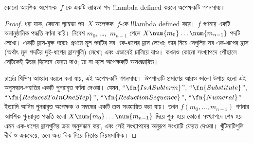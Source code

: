 \documentclass[../../../include/open-logic-section]{subfiles}
\begin{document}

\begin{thm}
কোনো আংশিক অপেক্ষক~$f$-কে একটি ল্যাম্বডা পদ !!{lambda defined} করলে
অপেক্ষকটি গণনসাধ্য।
\end{thm}

\begin{proof}
ধরা যাক, কোনো ল্যাম্বডা পদ~$X$ অপেক্ষক~$f$-কে !!{lambda defined} করে।
$f$ গণনার একটি অনানুষ্ঠানিক পদ্ধতি বর্ণনা করি। নিবেশ $m_0$,
\dots,~$m_{n-1}$ পেলে $X \num{m_0} \ldots \num{m_{n-1}}$ পদটি লেখো।
একটি হ্রাস-বৃক্ষ গড়ো: প্রথমে মূল পদটির সব এক-ধাপের হ্রাস লেখো; তার নিচে
সেগুলির সব এক-ধাপের হ্রাস (অর্থাৎ মূল পদটির দুই-ধাপের হ্রাসগুলি) লেখো;
এবং এভাবেই চালিয়ে যাও। কখনও কোনো সংখ্যাপদে পৌঁছালে সেটিকেই উত্তর হিসেবে
ফেরত দাও; তা না হলে অপেক্ষকটি অসংজ্ঞায়িত।

চার্চের থিসিস আহ্বান করলে বলা যায়, এই অপেক্ষকটি গণনসাধ্য। উপপাদ্যটি
প্রমাণের আরও ভালো উপায় হলো এই অনুসন্ধান-পদ্ধতির একটি পুনরাবৃত্ত বর্ণনা
দেওয়া। যেমন, ``$\fn{IsASubterm}$'', ``$\fn{Substitute}$'',
``$\fn{ReducesToInOneStep}$'', ``$\fn{ReductionSequence}$'',
``$\fn{Numeral}$'' ইত্যাদি আদিম পুনরাবৃত্ত অপেক্ষক ও সম্বন্ধের একটি ক্রম
সংজ্ঞায়িত করা যায়। তখন $f(m_0, \dots, m_{n-1})$ গণনার আংশিক পুনরাবৃত্ত
পদ্ধতি হলো $X \num{m_0} \dots \num{m_{n-1}}$ দিয়ে শুরু হয়ে কোনো
সংখ্যাপদে শেষ হয় এমন এক-ধাপের হ্রাসগুলির ক্রম অনুসন্ধান করা, এবং সেই
সংখ্যাপদের অনুরূপ সংখ্যাটি ফেরত দেওয়া। খুঁটিনাটিগুলি দীর্ঘ ও একঘেয়ে,
তবে অন্য দিক দিয়ে নিতান্ত নিয়মমাফিক।
\end{proof}
\end{document}
